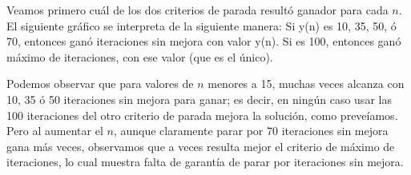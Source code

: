 Veamos primero cuál de los dos criterios de parada resultó ganador para cada $n$. El siguiente gráfico se interpreta de la siguiente manera: Si y(n) es 10, 35, 50, ó 70, entonces ganó iteraciones sin mejora con valor y(n). Si es 100, entonces ganó máximo de iteraciones, con ese valor (que es el único).
\begin{figure}[H]
    \begin{minipage}[t]{\linewidth}
		\centering
		\label{fig:ejercicio-5-configuracion-conjunto-1}
    \end{minipage}
\end{figure}
Podemos observar que para valores de $n$ menores a 15, muchas veces alcanza con 10, 35 ó 50 iteraciones sin mejora para ganar; es decir, en ningún caso usar las 100 iteraciones del otro criterio de parada mejora la solución, como preveíamos. Pero al aumentar el $n$, aunque claramente parar por 70 iteraciones sin mejora gana más veces, observamos que a veces resulta mejor el criterio de máximo de iteraciones, lo cual muestra falta de garantía de parar por iteraciones sin mejora.

